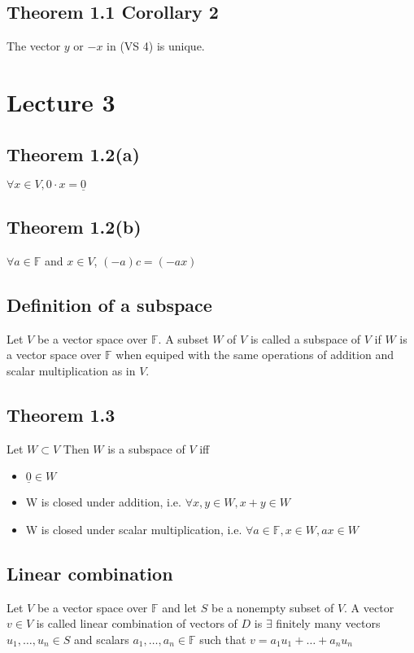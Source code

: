 \documentclass{article}
\begin{document}
\subsection{Theorem 1.1 Corollary 2}
The vector $y$ or $-x$ in (VS 4) is unique.\\


\section{Lecture 3}
\subsection{Theorem 1.2(a)}
$\forall x \in V, 0 \cdot x = \underline{0}$
\subsection{Theorem 1.2(b)}
$\forall a \in \mathds{F}$ and $x \in V$, $(-a)c = (-ax)$
\subsection{Definition of a subspace}
Let $V$ be a vector space over $\mathds{F}$. A subset $W$ of $V$ is called a subspace of $V$ if $W$ is a vector space over $\mathds{F}$ when equiped with the same operations of addition and scalar multiplication as in $V$. 
\subsection{Theorem 1.3}
Let $W \subset V$ Then $W$ is a subspace of $V$ iff\\
\begin{itemize}
    \item $\underline{0} \in W$
    \item W is closed under addition, i.e. $\forall x,y \in W, x + y \in W$
    \item W is closed under scalar multiplication, i.e. $\forall a \in \mathds{F}, x \in W, ax \in W$
\end{itemize}

\subsection{Linear combination}
Let $V$ be a vector space over $\mathds{F}$ and let $S$ be a nonempty subset of $V$. A vector $v \in V$ is called linear combination of vectors of $D$ is $\exists$ finitely many vectors $u_1, \dots, u_n \in S$ and scalars $a_1, \dots, a_n \in \mathds{F}$ such that $v = a_1u_1 + \dots + a_nu_n$
\end{document}
